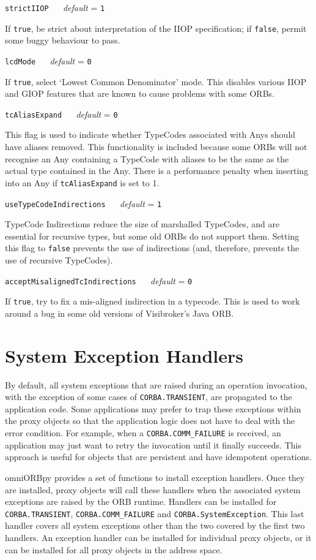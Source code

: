 \documentclass[11pt,oneside,a4paper]{book}
\makeatletter
\newcommand{\code}[1]{\texttt{#1}}
\newcommand{\confopt}[2]
  {\vspace{\baselineskip}\par\noindent\code{#1} ~~ \textit{default} =
   \code{#2}}
\renewcommand{\confopt}[2]
  {\vspace{\baselineskip}\par\noindent\code{#1} ~~ \textit{default} =
   \code{#2}\\[-1ex]\@afterheading}
\newcommand{\dsc}{\discretionary{}{}{}}
\makeatother
\begin{document}
\confopt{strictIIOP}{1}

If \code{true}, be strict about interpretation of the IIOP
specification; if \code{false}, permit some buggy behaviour to pass.


\confopt{lcdMode}{0}

If \code{true}, select `Lowest Common Denominator' mode. This disables
various IIOP and GIOP features that are known to cause problems with
some ORBs.


\confopt{tcAliasExpand}{0}

This flag is used to indicate whether TypeCodes associated with Anys
should have aliases removed. This functionality is included because
some ORBs will not recognise an Any containing a TypeCode with aliases
to be the same as the actual type contained in the Any. There is a
performance penalty when inserting into an Any if \code{tcAliasExpand}
is set to 1.


\confopt{useTypeCodeIndirections}{1}

TypeCode Indirections reduce the size of marshalled TypeCodes, and are
essential for recursive types, but some old ORBs do not support them.
Setting this flag to \code{false} prevents the use of indirections
(and, therefore, prevents the use of recursive TypeCodes).


\confopt{acceptMisalignedTcIndirections}{0}

If \code{true}, try to fix a mis-aligned indirection in a
typecode. This is used to work around a bug in some old versions of
Visibroker's Java ORB.


\vspace{2\baselineskip}


\section{System Exception Handlers}
\label{sec:exHandlers}

By default, all system exceptions that are raised during an operation
invocation, with the exception of some cases of
\code{CORBA.TRANSIENT}, are propagated to the application code. Some
applications may prefer to trap these exceptions within the proxy
objects so that the application logic does not have to deal with the
error condition. For example, when a \code{CORBA.COMM\_FAILURE} is
received, an application may just want to retry the invocation until
it finally succeeds. This approach is useful for objects that are
persistent and have idempotent operations.

omniORBpy provides a set of functions to install exception handlers.
Once they are installed, proxy objects will call these handlers when
the associated system exceptions are raised by the ORB runtime.
Handlers can be installed for \code{CORBA.\dsc{}TRANSIENT},
\code{CORBA.COMM\_FAILURE} and \code{CORBA.SystemException}.  This
last handler covers all system exceptions other than the two covered
by the first two handlers. An exception handler can be installed for
individual proxy objects, or it can be installed for all proxy objects
in the address space.
\end{document}
